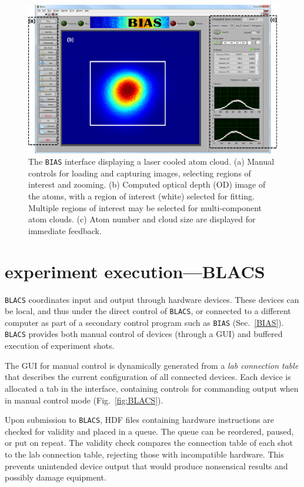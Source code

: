 \begin{figure}%
\includegraphics{figures/software/BIAS.eps}%
\caption{The \texttt{BIAS} interface displaying a laser cooled atom cloud.
(a) Manual controls for loading and capturing images, selecting regions of interest and zooming.
(b) Computed optical depth (OD) image of the atoms, with a region of interest (white) selected for fitting.
Multiple regions of interest may be selected for multi-component atom clouds.
(c) Atom number and cloud size are displayed for immediate feedback.
}
\label{fig:BIAS}%
\end{figure}


\section{experiment execution---BLACS\label{experiment_execution}}
\texttt{BLACS} coordinates input and output through hardware devices.
These devices can be local, and thus under the direct control of \texttt{BLACS}, or connected to a different computer as part of a secondary control program such as \texttt{BIAS} (Sec.~\ref{BIAS}).
\texttt{BLACS} provides both manual control of devices (through a GUI) and buffered execution of experiment shots.

The GUI for manual control is dynamically generated from a \textit{lab connection table} that describes the current configuration of all connected devices.
Each device is allocated a tab in the interface, containing controls for commanding output when in manual control mode (Fig.~\ref{fig:BLACS}).

Upon submission to \texttt{BLACS}, HDF files containing hardware instructions are checked for validity and placed in a queue.
The queue can be reordered, paused, or put on repeat.
The validity check compares the connection table of each shot to the lab connection table, rejecting those with incompatible hardware.
This prevents unintended device output that would produce nonsensical results and possibly damage equipment.


